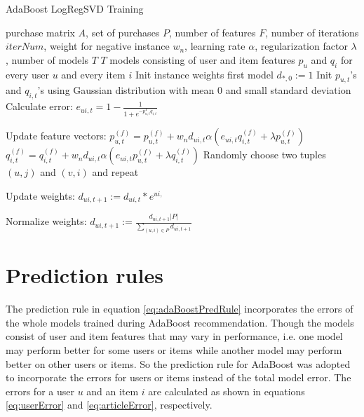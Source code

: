 \documentclass[10pt]{reportMaster}
\begin{document}
\begin{algorithm}
	\caption{AdaBoost LogRegSVD Training}
	\label{alg:AdaBoostLogRegSVDTraining}
	\begin{algorithmic}[1]
		\Require purchase matrix $A$, set of purchases $P$, number of features $F$, number of iterations $iterNum$, weight for negative instance $w_n$, learning rate $\alpha$, regularization factor $\lambda$, number of models $T$
		\Ensure $T$ models consisting of user and item features $p_u$ and $q_i$ for every user $u$ and every item $i$
		\State Init instance weights first model $d_{*,0} := 1$
				\State Init $p_{u,t}$'s and $q_{i,t}$'s using Gaussian distribution with mean $0$ and small standard deviation
					\State Calculate error:
					\State $e_{ui,t} = 1 - \frac{1}{1 + e^{-p_{u,t}^Tq_{i,t}}}$
					
					\State Update feature vectors:
						\State $p_{u,t}^{(f)} = p_{u,t}^{(f)} + w_n d_{ui,t} \alpha (e_{ui, t} q_{i,t}^{(f)} + \lambda p_{u,t}^{(f)})$
						\State $q_{i,t}^{(f)} = q_{i,t}^{(f)} + w_n d_{ui,t} \alpha (e_{ui, t} p_{u,t}^{(f)} + \lambda q_{i,t}^{(f)})$
					\EndFor	
					\State Randomly choose two tuples $(u,j)$ and $(v,i)$ and repeat
				\EndFor
			\EndFor
			
			\State Update weights:
				\State $d_{ui,t+1} := d_{ui,t} * e^{ui,}$
			\EndFor
			
			\State Normalize weights:
			\State $d_{ui,t+1} := \frac{d_{ui,t+1} |P|}{\sum_{(u,i) \in P}{d_{ui, t+1}}}$
			\EndFor 
		\EndFor
		
		
	\end{algorithmic}	
\end{algorithm}


\section{Prediction rules}
\label{sec:predictionRules}

The prediction rule in equation \ref{eq:adaBoostPredRule} incorporates the errors of the whole models trained during AdaBoost recommendation.
Though the models consist of user and item features that may vary in performance, i.e. one model may perform better for some users or items while another model may perform better on other users or items.
So the prediction rule for AdaBoost was adopted to incorporate the errors for users or items instead of the total model error.
The errors for a user $u$ and an item $i$ are calculated as shown in equations \ref{eq:userError} and \ref{eq:articleError}, respectively.
\end{document}
